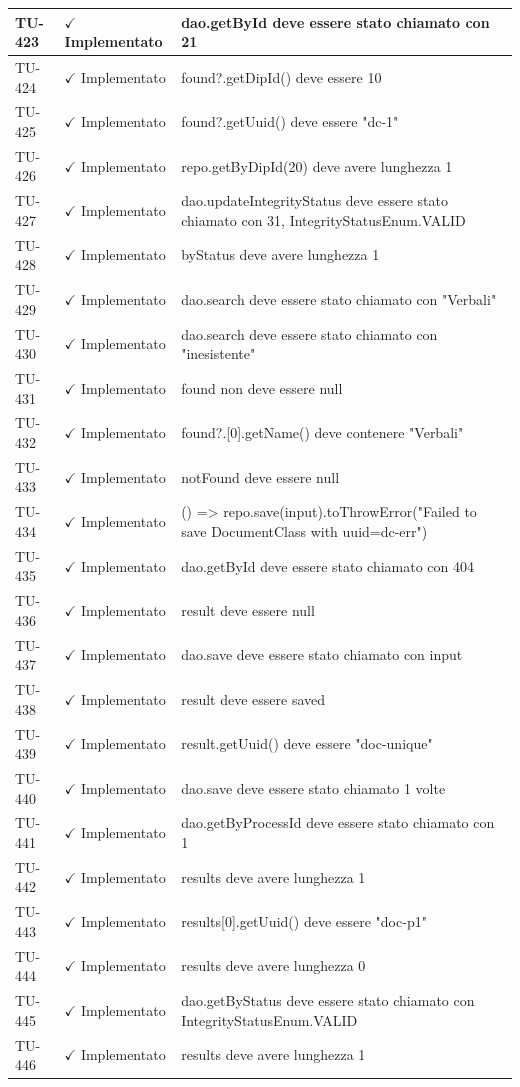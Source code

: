 ﻿\documentclass[a4paper,12pt]{article}
\newcommand{\ok}{\textcolor{green!60!black}{$\checkmark$ Implementato}}
\begin{document}
\begin{longtable}{|p{2cm}|p{3.5cm}|p{9.5cm}|}
\hline
TU-423 & \ok & dao.getById deve essere stato chiamato con 21 \\
\hline
TU-424 & \ok & found?.getDipId() deve essere 10 \\
\hline
TU-425 & \ok & found?.getUuid() deve essere "dc-1" \\
\hline
TU-426 & \ok & repo.getByDipId(20) deve avere lunghezza 1 \\
\hline
TU-427 & \ok & dao.updateIntegrityStatus deve essere stato chiamato con 31, IntegrityStatusEnum.VALID \\
\hline
TU-428 & \ok & byStatus deve avere lunghezza 1 \\
\hline
TU-429 & \ok & dao.search deve essere stato chiamato con "Verbali" \\
\hline
TU-430 & \ok & dao.search deve essere stato chiamato con "inesistente" \\
\hline
TU-431 & \ok & found non deve essere null \\
\hline
TU-432 & \ok & found?.[0].getName() deve contenere "Verbali" \\
\hline
TU-433 & \ok & notFound deve essere null \\
\hline
TU-434 & \ok & () => repo.save(input).toThrowError("Failed to save DocumentClass with uuid=dc-err") \\
\hline
TU-435 & \ok & dao.getById deve essere stato chiamato con 404 \\
\hline
TU-436 & \ok & result deve essere null \\
\hline
TU-437 & \ok & dao.save deve essere stato chiamato con input \\
\hline
TU-438 & \ok & result deve essere saved \\
\hline
TU-439 & \ok & result.getUuid() deve essere "doc-unique" \\
\hline
TU-440 & \ok & dao.save deve essere stato chiamato 1 volte \\
\hline
TU-441 & \ok & dao.getByProcessId deve essere stato chiamato con 1 \\
\hline
TU-442 & \ok & results deve avere lunghezza 1 \\
\hline
TU-443 & \ok & results[0].getUuid() deve essere "doc-p1" \\
\hline
TU-444 & \ok & results deve avere lunghezza 0 \\
\hline
TU-445 & \ok & dao.getByStatus deve essere stato chiamato con IntegrityStatusEnum.VALID \\
\hline
TU-446 & \ok & results deve avere lunghezza 1 \\

\end{longtable}
\end{document}
